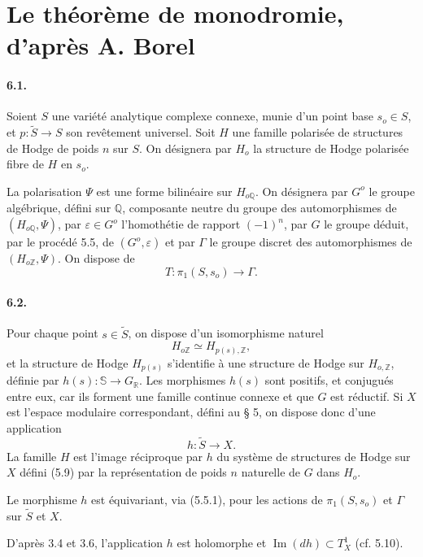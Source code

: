 \documentclass[10pt]{article}
\newcommand{\R}{\mathbb R}
\newcommand{\Z}{\mathbb Z}
\newcommand{\Q}{\mathbb Q}
\newcommand{\bS}{\mathbb S}
\theoremstyle{deligne}
\begin{document}
\section{Le théorème de monodromie, d'après A. Borel}

\paragraph{6.1.}
Soient $S$ une variété analytique complexe connexe, munie d'un point base $s_o\in S$, et $p:\widetilde S\to S$ son revêtement universel. Soit $H$ une famille polarisée de structures de Hodge de poids $n$ sur $S$. On désignera par $H_o$ la structure de Hodge polarisée fibre de $H$ en $s_o$.

La polarisation $\Psi$ est une forme bilinéaire sur $H_{o\Q}$. On désignera par $G^o$ le groupe algébrique, défini sur $\Q$, composante neutre du groupe des automorphismes de $(H_{o\Q},\Psi)$, par $\varepsilon\in G^o$ l'homothétie de rapport $(-1)^n$, par $G$ le groupe déduit, par le procédé 5.5, de $(G^o,\varepsilon)$ et par $\Gamma$ le groupe discret des automorphismes de $(H_{o\Z},\Psi)$. On dispose de
\[
\tag{6.1.1}
  T:\pi_1(S,s_o)\longrightarrow\Gamma .
\]

\paragraph{6.2.}
Pour chaque point $s\in\widetilde S$, on dispose d'un isomorphisme naturel
\[
  H_{o\Z}\simeq H_{p(s),\Z},
\]
et la structure de Hodge $H_{p(s)}$ s'identifie à une structure de Hodge sur $H_{o,\Z}$, définie par $h(s):\bS\to G_\R$. Les morphismes $h(s)$ sont positifs, et conjugués entre eux, car ils forment une famille continue connexe et que $G$ est réductif. Si $X$ est l'espace modulaire correspondant, défini au § 5, on dispose donc d'une application
\[
  h:\widetilde S\longrightarrow X.
\]
La famille $H$ est l'image réciproque par $h$ du système de structures de Hodge sur $X$ défini (5.9) par la représentation de poids $n$ naturelle de $G$ dans $H_o$.

Le morphisme $h$ est équivariant, via (5.5.1), pour les actions de $\pi_1(S,s_o)$ et $\Gamma$ sur $\widetilde S$ et $X$.

D'après 3.4 et 3.6, l'application $h$ est holomorphe et $\operatorname{Im}(dh)\subset T_X^1$ (cf. 5.10).
\end{document}
